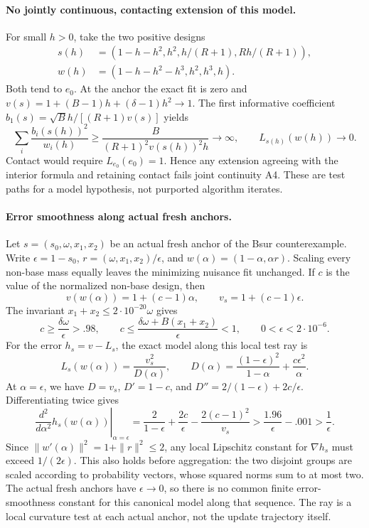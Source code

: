 \paragraph{No jointly continuous, contacting extension of this model.}
For small $h>0$, take the two positive designs
\[
 \begin{aligned}
 s(h)&=(1-h-h^2,h^2,h/(R+1),Rh/(R+1)),\\
 w(h)&=(1-h-h^2-h^3,h^2,h^3,h).
 \end{aligned}
\]
Both tend to $e_0$. At the anchor the exact fit is zero and
$v(s)=1+(B-1)h+(\delta-1)h^2\to1$. The first informative coefficient
$b_1(s)=\sqrt B h/[(R+1)v(s)]$ yields
\[
 \sum_i\frac{b_i(s(h))^2}{w_i(h)}
 \ge\frac{B}{(R+1)^2v(s(h))^2h}\longrightarrow\infty,
 \qquad L_{s(h)}(w(h))\longrightarrow0.
\]
Contact would require $L_{e_0}(e_0)=1$. Hence any extension agreeing with
the interior formula and retaining contact fails joint continuity A4.
These are test paths for a model hypothesis, not purported algorithm iterates.

\paragraph{Error smoothness along actual fresh anchors.}
Let $s=(s_0,\omega,x_1,x_2)$ be an actual fresh anchor of the Bsur
counterexample. Write $\epsilon=1-s_0$, $r=(\omega,x_1,x_2)/\epsilon$,
and $w(\alpha)=(1-\alpha,\alpha r)$. Scaling every non-base mass equally
leaves the minimizing nuisance fit unchanged. If $c$ is the value of the
normalized non-base design, then
\[
 v(w(\alpha))=1+(c-1)\alpha,\qquad v_s=1+(c-1)\epsilon.
\]
The invariant $x_1+x_2\le2\cdot10^{-20}\omega$ gives
\[
 c\ge\frac{\delta\omega}{\epsilon}>.98,\qquad
 c\le\frac{\delta\omega+B(x_1+x_2)}{\epsilon}<1,
 \qquad 0<\epsilon<2\cdot10^{-6}.
\]
For the error $h_s=v-L_s$, the exact model along this local test ray is
\[
 L_s(w(\alpha))=\frac{v_s^2}{D(\alpha)},\qquad
 D(\alpha)=\frac{(1-\epsilon)^2}{1-\alpha}
                 +\frac{c\epsilon^2}{\alpha}.
\]
At $\alpha=\epsilon$, we have $D=v_s$, $D'=1-c$, and
$D''=2/(1-\epsilon)+2c/\epsilon$. Differentiating twice gives
\[
 \left.\frac{d^2}{d\alpha^2}h_s(w(\alpha))\right|_{\alpha=\epsilon}
 =\frac2{1-\epsilon}+\frac{2c}{\epsilon}
      -\frac{2(c-1)^2}{v_s}
 >\frac{1.96}{\epsilon}-.001>\frac1\epsilon.
\]
Since $\|w'(\alpha)\|^2=1+\|r\|^2\le2$, any local Lipschitz constant
for $\nabla h_s$ must exceed $1/(2\epsilon)$. This also holds before
aggregation: the two disjoint groups are scaled according to probability
vectors, whose squared norms sum to at most two. The actual fresh anchors
have $\epsilon\to0$, so there is no common finite error-smoothness constant
for this canonical model along that sequence. The ray is a local curvature
test at each actual anchor, not the update trajectory itself.

